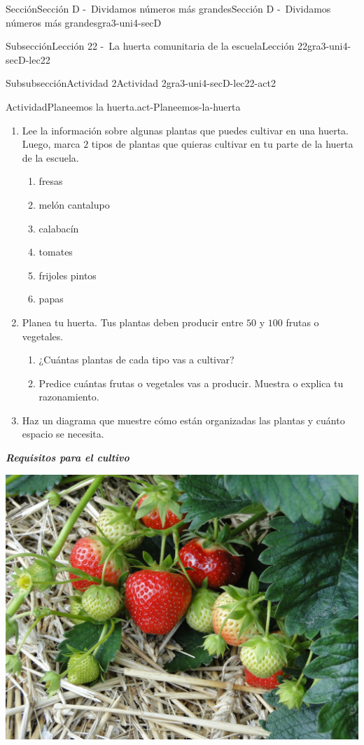 \documentclass[twoside,10pt,]{article}
\newcommand{\alert}[1]{\textbf{\textit{#1}}}
\begin{document}
\begin{sectionptx}{Sección}{Sección D -~Dividamos números más grandes}{}{Sección D -~Dividamos números más grandes}{}{}{gra3-uni4-secD}
\begin{subsectionptx}{Subsección}{Lección 22 -~La huerta comunitaria de la escuela}{}{Lección 22}{}{}{gra3-uni4-secD-lec22}
\typeout{************************************************}
%
\begin{subsubsectionptx}{Subsubsección}{Actividad 2}{}{Actividad 2}{}{}{gra3-uni4-secD-lec22-act2}
\begin{activity}{Actividad}{Planeemos la huerta.}{act-Planeemos-la-huerta}%
%
\begin{enumerate}
\item{}Lee la información sobre algunas plantas que puedes cultivar en una huerta. Luego, marca \(2\) tipos de plantas que quieras cultivar en tu parte de la huerta de la escuela.%
%
\begin{enumerate}
\item{}fresas%
\item{}melón cantalupo%
\item{}calabacín%
\item{}tomates%
\item{}frijoles pintos%
\item{}papas%
\end{enumerate}
\item{}Planea tu huerta. Tus plantas deben producir entre \(50\) y \(100\) frutas o vegetales.%
%
\begin{enumerate}
\item{}¿Cuántas plantas de cada tipo vas a cultivar?%
\item{}Predice cuántas frutas o vegetales vas a producir. Muestra o explica tu razonamiento.%
\end{enumerate}
\item{}Haz un diagrama que muestre cómo están organizadas las plantas y cuánto espacio se necesita.%
\end{enumerate}
\alert{Requisitos para el cultivo}%
\begin{sidebyside}{2}{0.025}{0.025}{0.05}%
\begin{sbspanel}{0.45}%
\includegraphics[width=\linewidth]{external/jpg-source/3-4-D-22 Act1-Fresas.jpg}

\end{sbspanel}
\end{sidebyside}
\end{activity}
\end{subsubsectionptx}
\end{subsectionptx}
\end{sectionptx}
\end{document}
